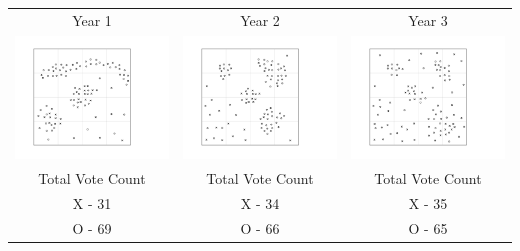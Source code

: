 \begin{tabular}{c c c }

Year 1 & Year 2 & Year 3 \\
 \includegraphics[width=2in]{assets/Gerrymandering/Gerry4x4-100-1.pdf} &  \includegraphics[width=2in]{assets/Gerrymandering/Gerry4x4-100-2.pdf} &  \includegraphics[width=2in]{assets/Gerrymandering/Gerry4x4-100-3.pdf}\\
 Total Vote Count &  Total Vote Count &  Total Vote Count\\
 X -  31& X - 34 & X  - 35\\
 O - 69 & O - 66 & O - 65
 \end{tabular}
